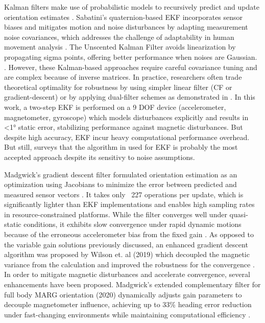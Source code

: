 \documentclass{iutbscthesis}
\begin{document}
Kalman filters make use of probabilistic models to recursively predict and update orientation estimates \cite{EKF}. Sabatini’s quaternion-based EKF incorporates sensor biases and mitigates motion and noise disturbances by adapting measurement noise covariances, which addresses the challenge of adaptability in human movement analysis \cite{quatEKF}. The Unscented Kalman Filter avoids linearization by propagating sigma points, offering better performance when noises are Gaussian. \cite{UKF}. However, these Kalman-based approaches require careful covariance tuning and are complex because of inverse matrices. In practice, researchers often trade theoretical optimality for robustness by using simpler linear filter (CF or gradient-descent) or by applying dual-filter schemes as demonstrated in \cite{doubleEKF}. In this work, a two-step EKF is performed on a 9 DOF  device (accelerometer, magnetometer, gyroscope) which models disturbances explicitly and results in <1° static error, stabilizing performance against magnetic disturbances. But despite high accuracy, EKF incur heavy computational performance overhead. But still, \cite{vertzberger2022adaptive} surveys that the algorithm in \cite{quest} used for EKF \cite{EKF} is probably the most accepted approach despite its sensitivy to noise assumptions. 

Madgwick’s gradient descent filter formulated orientation estimation as an optimization using Jacobians to minimize the error between predicted and measured sensor vectors \cite{madgwick2011estimation}. It takes only ~227 operations per update, which is significantly lighter than EKF implementations and enables high sampling rates in resource-constrained platforms. While the filter converges well under quasi-static conditions, it exhibits slow convergence under rapid dynamic motions because of the erroneous accelerometer bias from the fixed gain \cite{bettermadg}. As opposed to the variable gain solutions previously discussed, an enhanced gradient descent algorithm was proposed by Wilson et. al (2019) which decoupled the magnetic variance from the calculation and improved the robustness for the convergence \cite{bettermadg}. In order to mitigate magnetic disturbances and accelerate convergence, several enhancements have been proposed. Madgwick’s extended complementary filter for full body MARG orientation (2020) dynamically adjusts gain parameters to decouple magnetometer influence, achieving up to 33\% heading error reduction under fast-changing environments while maintaining computational efficiency \cite{extendedMADG}.
\end{document}
